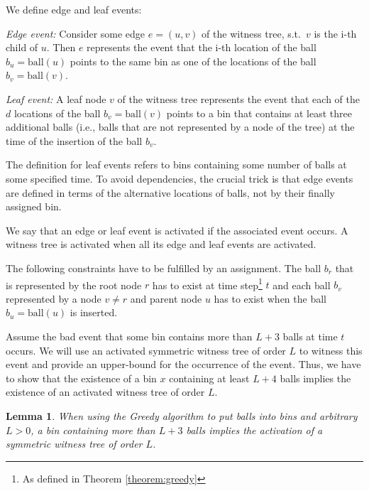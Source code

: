 \documentclass[a4paper,12pt]{article}
\newcommand\todo[1]{\textcolor{red}{(TODO: #1)}}
\newtheorem{lemma}{Lemma}
\begin{document}
We define edge and leaf events:
\begin{compactitem}
\item \emph{Edge event:} Consider some edge $e = (u,v)$ of the witness tree, s.t.~$v$ is the i-th child of $u$. Then $e$ represents the event that the i-th location of the ball $b_u = \mathrm{ball}(u)$ points to the same bin as one of the locations of the ball $b_v = \mathrm{ball}(v)$. 
\item \emph{Leaf event:} A leaf node $v$ of the witness tree represents the event that each of the $d$ locations of the ball $b_v = \mathrm{ball}(v)$ points to a bin that contains at least three additional balls (i.e., balls that are not represented by a node of the tree) at the time of the insertion of the ball $b_v$.
\end{compactitem}
The definition for leaf events refers to bins containing some number of balls at some specified time. To avoid dependencies, the crucial trick is that edge events are defined in terms of the alternative locations of balls, not by their finally assigned bin. 

We say that an edge or leaf event is activated if the associated event occurs. A witness tree is activated when all its edge and leaf events are activated. 

The following constraints have to be fulfilled by an assignment. The ball $b_r$ that is represented by the root node $r$ has to exist at time step\footnote{As defined in Theorem \ref{theorem:greedy}} $t$ and each ball $b_v$ represented by a node $v \neq r$ and parent node $u$ has to exist when the ball $b_u = \mathrm{ball}(u)$ is inserted.

Assume the bad event that some bin contains more than $L+3$ balls at time $t$ occurs. We will use an activated symmetric witness tree of order $L$ to witness this event and provide an upper-bound for the occurrence of the event. Thus, we have to show that the existence of a bin $x$ containing at least $L+4$ balls implies the existence of an activated witness tree of order $L$. 

\begin{lemma}
When using the Greedy algorithm to put balls into bins and arbitrary $L > 0$, a bin containing more than $L+3$ balls implies the activation of a symmetric witness tree of order $L$.
\end{lemma}
\end{document}
